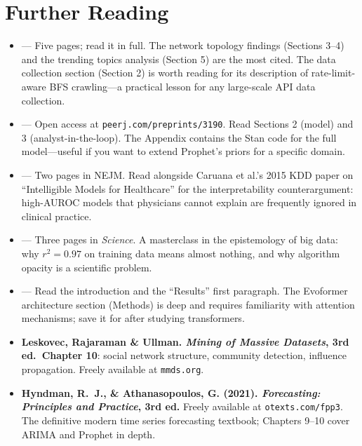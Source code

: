 \section*{Further Reading}
\label{sec:ch10-further}

\begin{itemize}
  \item \textbf{\cite{Kwak2010}} --- Five pages; read it in full.
        The network topology findings (Sections 3--4) and the trending
        topics analysis (Section 5) are the most cited. The data collection
        section (Section 2) is worth reading for its description of
        rate-limit-aware BFS crawling---a practical lesson for any
        large-scale API data collection.
  \item \textbf{\cite{Prophet2018}} --- Open access at
        \texttt{peerj.com/preprints/3190}. Read Sections 2 (model)
        and 3 (analyst-in-the-loop). The Appendix contains the Stan
        code for the full model---useful if you want to extend Prophet's
        priors for a specific domain.
  \item \textbf{\cite{Obermeyer2016}} --- Two pages in NEJM.
        Read alongside Caruana et al.'s 2015 KDD paper on ``Intelligible
        Models for Healthcare'' for the interpretability counterargument:
        high-AUROC models that physicians cannot explain are frequently
        ignored in clinical practice.
  \item \textbf{\cite{LazerFluTrends2014}} --- Three pages in
        \textit{Science}. A masterclass in the epistemology of big data:
        why $r^2 = 0.97$ on training data means almost nothing, and why
        algorithm opacity is a scientific problem.
  \item \textbf{\cite{AlphaFold2021}} --- Read the introduction and
        the ``Results'' first paragraph. The Evoformer architecture
        section (Methods) is deep and requires familiarity with
        attention mechanisms; save it for after studying transformers.
  \item \textbf{Leskovec, Rajaraman \& Ullman.
        \textit{Mining of Massive Datasets}, 3rd ed.\ Chapter 10}:
        social network structure, community detection, influence
        propagation. Freely available at \texttt{mmds.org}.
  \item \textbf{Hyndman, R.~J., \& Athanasopoulos, G. (2021).
        \textit{Forecasting: Principles and Practice}, 3rd ed.}
        Freely available at \texttt{otexts.com/fpp3}. The definitive
        modern time series forecasting textbook; Chapters 9--10 cover
        ARIMA and Prophet in depth.
\end{itemize}
